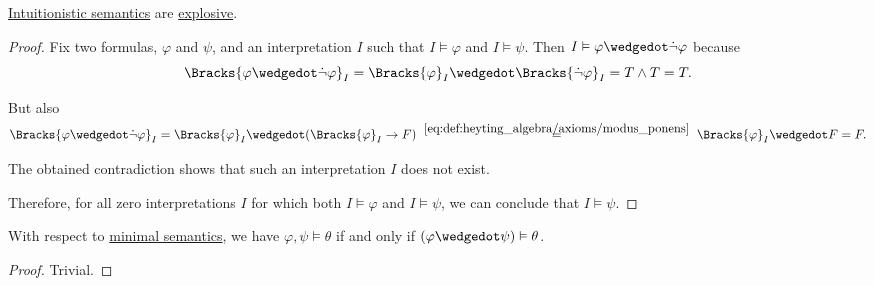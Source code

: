 \begin{proposition}\label{thm:intuitionistic_semantics_are_explosive}
  \hyperref[def:propositional_semantics]{Intuitionistic semantics} are \hyperref[def:paraconsistent_consequence_operator]{explosive}.
\end{proposition}
\begin{proof}
  Fix two formulas, \( \varphi \) and \( \psi \), and an interpretation \( I \) such that \( I \vDash \varphi \) and \( I \vDash \psi \). Then \( I \vDash \varphi \synwedge \synneg \varphi \) because
  \begin{equation*}
    \Bracks{\varphi \synwedge \synneg \varphi}_I
    =
    \Bracks{\varphi}_I \synwedge \Bracks{\synneg \varphi}_I
    =
    T \wedge T
    =
    T.
  \end{equation*}

  But also
  \begin{equation*}
    \Bracks{\varphi \synwedge \synneg \varphi}_I
    =
    \Bracks{\varphi}_I \synwedge (\Bracks{\varphi}_I \rightarrow F)
    \reloset {\eqref{eq:def:heyting_algebra/axioms/modus_ponens}} =
    \Bracks{\varphi}_I \synwedge F
    =
    F.
  \end{equation*}

  The obtained contradiction shows that such an interpretation \( I \) does not exist.

  Therefore, for all zero interpretations \( I \) for which both \( I \vDash \varphi \) and \( I \vDash \psi \), we can conclude that \( I \vDash \psi \).
\end{proof}

\begin{proposition}\label{thm:semantic_propositional_conjunction_of_premises}
  With respect to \hyperref[def:minimal_propositional_semantics]{minimal semantics}, we have \( \varphi, \psi \vDash \theta \) if and only if \( (\varphi \synwedge \psi) \vDash \theta \).
\end{proposition}
\begin{proof}
  Trivial.
\end{proof}

